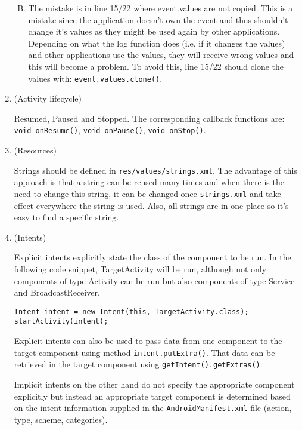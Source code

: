 \documentclass[11pt]{article}
\begin{document}
\begin{enumerate}
\begin{enumerate}[A)]
\begin{enumerate}[a)]
\end{enumerate}

\item
The mistake is in line 15/22 where event.values are not copied. This is a mistake since the application doesn't own the event and thus shouldn't change it's values as they might be used again by other applications. Depending on what the log function does (i.e. if it changes the values) and other applications use the values, they will receive wrong values and this will become a problem. To avoid this, line 15/22 should clone the values with: \lstinline{event.values.clone()}.

\end{enumerate}

\item (Activity lifecycle)

Resumed, Paused and Stopped. The corresponding callback functions are:
\lstinline{void onResume()}, \lstinline{void onPause()}, \lstinline{void onStop()}.

\item (Resources)

Strings should be defined in \lstinline{res/values/strings.xml}. The advantage of this approach is that a string can be reused many times and when there is the need to change this string, it can be changed once \lstinline{strings.xml} and take effect everywhere the string is used. Also, all strings are in one place so it's easy to find a specific string.

\item (Intents)

Explicit intents explicitly state the class of the component to be run. In the following code snippet, TargetActivity will be run, although not only components of type Activity can be run but also components of type Service and BroadcastReceiver.

\begin{lstlisting}
Intent intent = new Intent(this, TargetActivity.class);
startActivity(intent);
\end{lstlisting}

Explicit intents can also be used to pass data from one component to the target component using method \lstinline{intent.putExtra()}. That data can be retrieved in the target component using \lstinline{getIntent().getExtras()}.

Implicit intents on the other hand do not specify the appropriate component explicitly but instead an appropriate target component is determined based on the intent information supplied in the \lstinline{AndroidManifest.xml} file (action, type, scheme, categories).


\end{enumerate}
\end{document}
